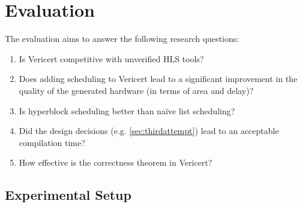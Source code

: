 \graphicspath{{./figures/5-hyperblock-scheduling/}}

\newcommand\benchmark[1]{\textcolor{benchcol}{\textsf{#1}}}

\chapter{Evaluation}%
\label{sec:evaluation}%
\label{sec:performance-comparison}

The evaluation aims to answer the following research questions:

\begin{enumerate}[label=\textbf{RQ\arabic*}]
\item Is Vericert competitive with unverified HLS tools?
\item Does adding scheduling to Vericert lead to a significant improvement in
  the quality of the generated hardware (in terms of area and delay)?
\item Is hyperblock scheduling better than na\"ive list scheduling?
\item Did the design decisions (e.g. \cref{sec:thirdattempt}) lead to an
  acceptable compilation time?
\item How effective is the correctness theorem in Vericert?
\end{enumerate}

\section{Experimental Setup}

\def\polybench{PolyBench/C}

